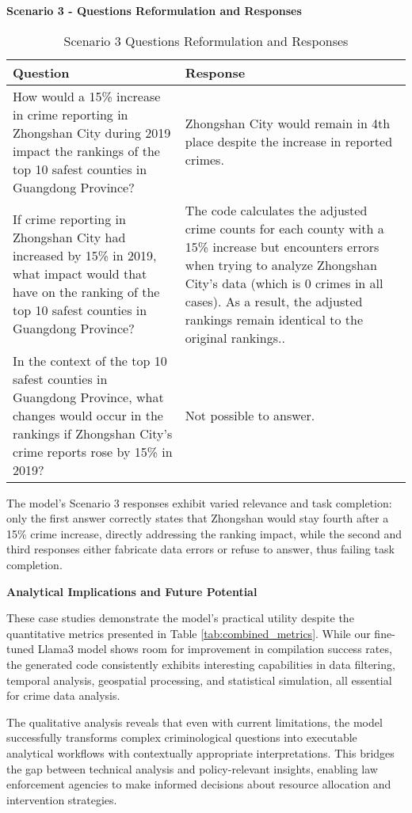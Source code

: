 \noindent \textbf{Scenario 3 - Questions Reformulation and Responses}

\begin{table}[hbtp]
\centering
\small
\begin{tabular}{|p{}|p{}|}
\hline
\textbf{Question} & \textbf{Response} \\
\hline
How would a 15\% increase in crime reporting in Zhongshan City during 2019 impact the rankings of the top 10 safest counties in Guangdong Province? & Zhongshan City would remain in 4th place despite the increase in reported crimes. \\
\hline
If crime reporting in Zhongshan City had increased by 15\% in 2019, what impact would that have on the ranking of the top 10 safest counties in Guangdong Province? &The code calculates the adjusted crime counts for each county with a 15\% increase but encounters errors when trying to analyze Zhongshan City's data (which is 0 crimes in all cases). As a result, the adjusted rankings remain identical to the original rankings.. \\
\hline
In the context of the top 10 safest counties in Guangdong Province, what changes would occur in the rankings if Zhongshan City's crime reports rose by 15\% in 2019? & Not possible to answer. \\
\hline
\end{tabular}
\caption{Scenario 3 Questions Reformulation and Responses}
\label{tab:questions_responses_3}
\end{table}

The model's Scenario 3 responses exhibit varied relevance and task completion: only the first answer correctly states that Zhongshan would stay fourth after a 15\% crime increase, directly addressing the ranking impact, while the second and third responses either fabricate data errors or refuse to answer, thus failing task completion.


\noindent \textbf{Analytical Implications and Future Potential}

These case studies demonstrate the model's practical utility despite the quantitative metrics presented in Table \ref{tab:combined_metrics}. While our fine-tuned Llama3 model shows room for improvement in compilation success rates, the generated code consistently exhibits interesting capabilities in data filtering, temporal analysis, geospatial processing, and statistical simulation, all essential for crime data analysis.

The qualitative analysis reveals that even with current limitations, the model successfully transforms complex criminological questions into executable analytical workflows with contextually appropriate interpretations. This bridges the gap between technical analysis and policy-relevant insights, enabling law enforcement agencies to make informed decisions about resource allocation and intervention strategies.

